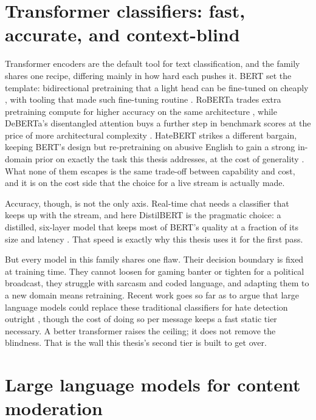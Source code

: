 \section{Transformer classifiers: fast, accurate, and context-blind}\label{transformer-classifiers-fast-accurate-and-context-blind}

Transformer encoders are the default tool for text classification, and the family shares one recipe, differing mainly in how hard each pushes it. BERT set the template: bidirectional pretraining that a light head can be fine-tuned on cheaply \citep{bert2019}, with tooling that made such fine-tuning routine \citep{transformers2020}. RoBERTa trades extra pretraining compute for higher accuracy on the same architecture \citep{roberta2019}, while DeBERTa's disentangled attention buys a further step in benchmark scores at the price of more architectural complexity \citep{deberta2021}. HateBERT strikes a different bargain, keeping BERT's design but re-pretraining on abusive English to gain a strong in-domain prior on exactly the task this thesis addresses, at the cost of generality \citep{hatebert2021}. What none of them escapes is the same trade-off between capability and cost, and it is on the cost side that the choice for a live stream is actually made.


Accuracy, though, is not the only axis. Real-time chat needs a classifier that keeps up with the stream, and here DistilBERT is the pragmatic choice: a distilled, six-layer model that keeps most of BERT's quality at a fraction of its size and latency \citep{distilbert2019}. That speed is exactly why this thesis uses it for the first pass.

But every model in this family shares one flaw. Their decision boundary is fixed at training time. They cannot loosen for gaming banter or tighten for a political broadcast, they struggle with sarcasm and coded language, and adapting them to a new domain means retraining. Recent work goes so far as to argue that large language models could replace these traditional classifiers for hate detection outright \citep{rethinkhate2025}, though the cost of doing so per message keeps a fast static tier necessary. A better transformer raises the ceiling; it does not remove the blindness. That is the wall this thesis's second tier is built to get over.

\section{Large language models for content moderation}\label{llms-for-moderation}

